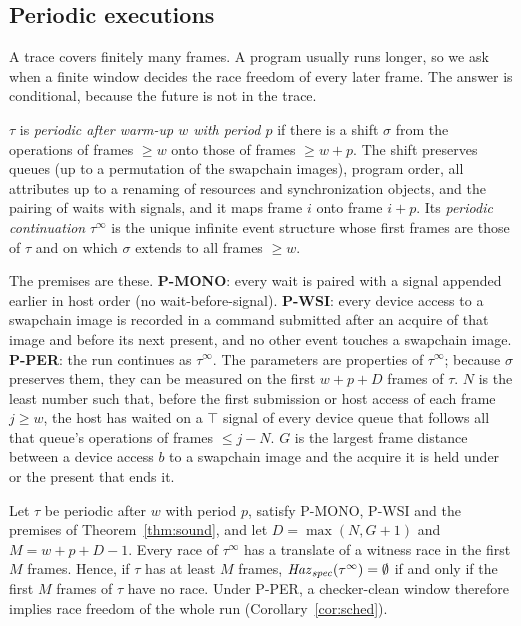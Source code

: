 \subsection{Periodic executions}
\label{sec:window}

A trace covers finitely many frames. A program usually runs longer, so we ask when a finite window decides the race
freedom of every later frame. The answer is conditional, because the future is not in the trace.

\begin{definition}\label{def:periodic}
$\tau$ is \emph{periodic after warm-up $w$ with period $p$} if there is a shift $\sigma$ from the operations of frames
$\ge w$ onto those of frames $\ge w+p$. The shift preserves queues (up to a permutation of the swapchain images),
program order, all attributes up to a renaming of resources and synchronization objects, and the pairing of waits with
signals, and it maps frame $i$ onto frame $i+p$. Its \emph{periodic continuation} $\tau^\infty$ is the unique infinite
event structure whose first frames are those of $\tau$ and on which $\sigma$ extends to all frames $\ge w$.
\end{definition}

The premises are these. \textbf{P-MONO}: every wait is paired with a signal appended earlier in host order (no
wait-before-signal). \textbf{P-WSI}: every device access to a swapchain image is recorded in a command submitted
after an acquire of that image and before its next present, and no other event touches a swapchain image.
\textbf{P-PER}: the run continues as $\tau^\infty$. The parameters are properties of $\tau^\infty$; because $\sigma$
preserves them, they can be measured on the first $w+p+D$ frames of $\tau$. $N$ is the least number such
that, before the first submission or host access of each frame $j \ge w$, the host has waited on a $\top$ signal of
every device queue that follows all that queue's operations of frames $\le j - N$. $G$ is the largest frame distance
between a device access $b$ to a swapchain image and the acquire it is held under or the present that ends it.

\begin{theorem}\label{thm:window}
Let $\tau$ be periodic after $w$ with period $p$, satisfy P-MONO, P-WSI and the premises of Theorem~\ref{thm:sound},
and let $D = \max(N, G+1)$ and $M = w + p + D - 1$. Every race of $\tau^\infty$ has a translate of a witness race in
the first $M$ frames. Hence, if $\tau$ has at least $M$ frames, $\mathit{Haz}_{\mathit{spec}}(\tau^\infty) = \emptyset$ if and only if the
first $M$ frames of $\tau$ have no race. Under P-PER, a checker-clean window therefore implies race freedom of the
whole run (Corollary~\ref{cor:sched}).
\end{theorem}

